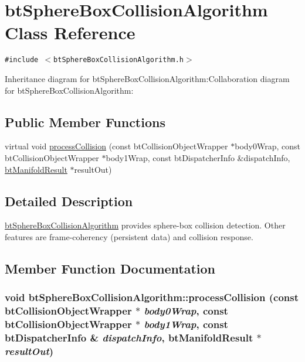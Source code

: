 \hypertarget{classbt_sphere_box_collision_algorithm}{
\section{btSphereBoxCollisionAlgorithm Class Reference}
\label{classbt_sphere_box_collision_algorithm}
}
{\tt \#include $<$btSphereBoxCollisionAlgorithm.h$>$}

Inheritance diagram for btSphereBoxCollisionAlgorithm:Collaboration diagram for btSphereBoxCollisionAlgorithm:\subsection*{Public Member Functions}
\begin{CompactItemize}
\item 
virtual void \hyperlink{classbt_sphere_box_collision_algorithm_b171b2afeabaaaa8a51728426643c369}{processCollision} (const btCollisionObjectWrapper $\ast$body0Wrap, const btCollisionObjectWrapper $\ast$body1Wrap, const btDispatcherInfo \&dispatchInfo, \hyperlink{classbt_manifold_result}{btManifoldResult} $\ast$resultOut)
\end{CompactItemize}


\subsection{Detailed Description}
\hyperlink{classbt_sphere_box_collision_algorithm}{btSphereBoxCollisionAlgorithm} provides sphere-box collision detection. Other features are frame-coherency (persistent data) and collision response. 

\subsection{Member Function Documentation}
\hypertarget{classbt_sphere_box_collision_algorithm_b171b2afeabaaaa8a51728426643c369}{
\subsubsection[processCollision]{\setlength{\rightskip}{0pt plus 5cm}void btSphereBoxCollisionAlgorithm::processCollision (const btCollisionObjectWrapper $\ast$ {\em body0Wrap}, \/  const btCollisionObjectWrapper $\ast$ {\em body1Wrap}, \/  const btDispatcherInfo \& {\em dispatchInfo}, \/  {\bf btManifoldResult} $\ast$ {\em resultOut})}}
\label{classbt_sphere_box_collision_algorithm_b171b2afeabaaaa8a51728426643c369}




